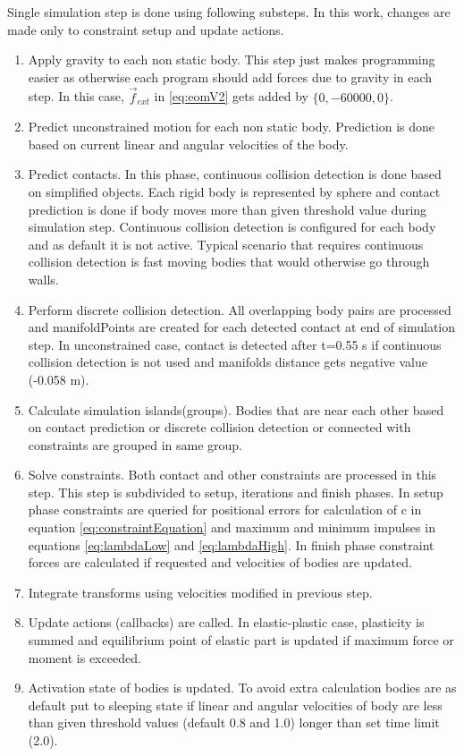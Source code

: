 Single simulation step is done using following substeps. 
In this work, changes are made only to constraint setup and update actions.
\begin{enumerate}
\item Apply gravity to each non static body. 
This step just makes programming easier as otherwise each program should add forces due to gravity in each step. 
In this case, $\vec{f}_{ext}$ in  \ref{eq:eomV2} gets added by $\lbrace{0,-60000,0}\rbrace$.
\item Predict unconstrained motion for each non static body. Prediction is done based on current linear and angular velocities of the body.
\item Predict contacts. In this phase, continuous collision detection is done based on simplified objects. 
Each rigid body is represented by sphere and contact prediction is done if body moves more than given threshold value during simulation step. Continuous collision detection is configured for each body and as default it is not active. 
Typical scenario that requires continuous collision detection is fast moving bodies that would otherwise go through walls.
\item Perform discrete collision detection. All overlapping body pairs are processed and manifoldPoints are created for
each detected contact at end of simulation step. 
In unconstrained case, contact is detected after t=0.55 s if continuous collision detection is not used and manifolds distance gets negative value (-0.058 m).
\item Calculate simulation islands(groups). Bodies that are near each other based on contact prediction or discrete collision detection
 or connected with constraints are grouped in same group.
\item Solve constraints. Both contact and other constraints are processed in this step. 
 This step is subdivided to setup, iterations and finish phases. 
In setup phase constraints are queried for positional errors for calculation of c in
equation \ref{eq:constraintEquation} and maximum and minimum impulses in equations \ref{eq:lambdaLow} and 
\ref{eq:lambdaHigh}.
In finish phase constraint forces are calculated if requested and velocities of bodies are updated.
\item Integrate transforms using velocities modified in previous step.
\item Update actions (callbacks) are called. 
In elastic-plastic case, plasticity is summed and equilibrium point of elastic part is updated if maximum force or moment is exceeded.
\item Activation state of bodies is updated. 
To avoid extra calculation bodies are as default put to sleeping state if linear and angular velocities of body are less than
given threshold values (default 0.8 and 1.0) longer than set time limit (2.0).
\end{enumerate} 

